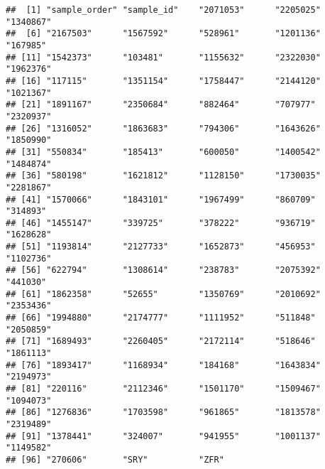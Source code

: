 \documentclass[
]{article}
\newenvironment{Shaded}{\begin{snugshade}}{\end{snugshade}}
\newcommand{\CommentTok}[1]{\textcolor[rgb]{0.56,0.35,0.01}{\textit{#1}}}
\newcommand{\ControlFlowTok}[1]{\textcolor[rgb]{0.13,0.29,0.53}{\textbf{#1}}}
\newcommand{\DataTypeTok}[1]{\textcolor[rgb]{0.13,0.29,0.53}{#1}}
\newcommand{\DecValTok}[1]{\textcolor[rgb]{0.00,0.00,0.81}{#1}}
\newcommand{\KeywordTok}[1]{\textcolor[rgb]{0.13,0.29,0.53}{\textbf{#1}}}
\newcommand{\NormalTok}[1]{#1}
\newcommand{\OperatorTok}[1]{\textcolor[rgb]{0.81,0.36,0.00}{\textbf{#1}}}
\newcommand{\StringTok}[1]{\textcolor[rgb]{0.31,0.60,0.02}{#1}}
\begin{document}
\begin{Shaded}
\end{Shaded}

\begin{verbatim}
##  [1] "sample_order" "sample_id"    "2071053"      "2205025"      "1340867"     
##  [6] "2167503"      "1567592"      "528961"       "1201136"      "167985"      
## [11] "1542373"      "103481"       "1155632"      "2322030"      "1962376"     
## [16] "117115"       "1351154"      "1758447"      "2144120"      "1021367"     
## [21] "1891167"      "2350684"      "882464"       "707977"       "2320937"     
## [26] "1316052"      "1863683"      "794306"       "1643626"      "1850990"     
## [31] "550834"       "185413"       "600050"       "1400542"      "1484874"     
## [36] "580198"       "1621812"      "1128150"      "1730035"      "2281867"     
## [41] "1570066"      "1843101"      "1967499"      "860709"       "314893"      
## [46] "1455147"      "339725"       "378222"       "936719"       "1628628"     
## [51] "1193814"      "2127733"      "1652873"      "456953"       "1102736"     
## [56] "622794"       "1308614"      "238783"       "2075392"      "441030"      
## [61] "1862358"      "52655"        "1350769"      "2010692"      "2353436"     
## [66] "1994880"      "2174777"      "1111952"      "511848"       "2050859"     
## [71] "1689493"      "2260405"      "2172114"      "518646"       "1861113"     
## [76] "1893417"      "1168934"      "184168"       "1643834"      "2194973"     
## [81] "220116"       "2112346"      "1501170"      "1509467"      "1094073"     
## [86] "1276836"      "1703598"      "961865"       "1813578"      "2319489"     
## [91] "1378441"      "324007"       "941955"       "1001137"      "1149582"     
## [96] "270606"       "SRY"          "ZFR"
\end{verbatim}
\end{document}
